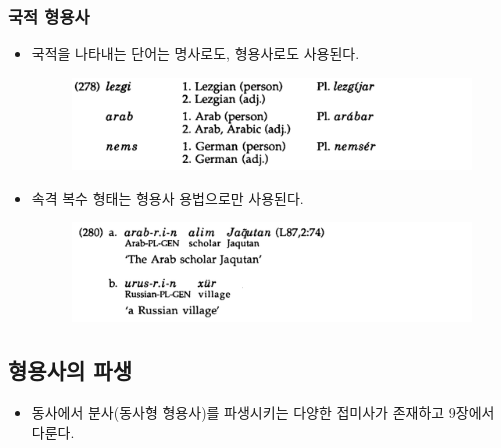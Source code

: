 \subsubsection{국적 형용사}
\begin{itemize}
\item 국적을 나타내는 단어는 명사로도, 형용사로도 사용된다.
\begin{figure}[H]
\centerline{\includegraphics[width=.8\linewidth]{Lezgian/src/ex278.png}}
\end{figure}
\item 속격 복수 형태는 형용사 용법으로만 사용된다.
\begin{figure}[H]
\centerline{\includegraphics[width=.8\linewidth]{Lezgian/src/ex280.png}}
\end{figure}
\end{itemize}

\subsection{형용사의 파생}
\begin{itemize}
\item 동사에서 분사(동사형 형용사)를 파생시키는 다양한 접미사가 존재하고 9장에서 다룬다.
\end{itemize}

